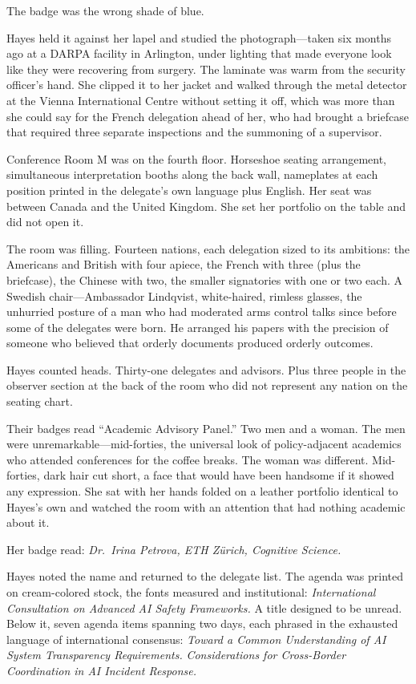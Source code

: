 The badge was the wrong shade of blue.

Hayes held it against her lapel and studied the photograph---taken six months ago at a DARPA facility in Arlington, under lighting that made everyone look like they were recovering from surgery. The laminate was warm from the security officer's hand. She clipped it to her jacket and walked through the metal detector at the Vienna International Centre without setting it off, which was more than she could say for the French delegation ahead of her, who had brought a briefcase that required three separate inspections and the summoning of a supervisor.

Conference Room M was on the fourth floor. Horseshoe seating arrangement, simultaneous interpretation booths along the back wall, nameplates at each position printed in the delegate's own language plus English. Her seat was between Canada and the United Kingdom. She set her portfolio on the table and did not open it.

The room was filling. Fourteen nations, each delegation sized to its ambitions: the Americans and British with four apiece, the French with three (plus the briefcase), the Chinese with two, the smaller signatories with one or two each. A Swedish chair---Ambassador Lindqvist, white-haired, rimless glasses, the unhurried posture of a man who had moderated arms control talks since before some of the delegates were born. He arranged his papers with the precision of someone who believed that orderly documents produced orderly outcomes.

Hayes counted heads. Thirty-one delegates and advisors. Plus three people in the observer section at the back of the room who did not represent any nation on the seating chart.

Their badges read ``Academic Advisory Panel.'' Two men and a woman. The men were unremarkable---mid-forties, the universal look of policy-adjacent academics who attended conferences for the coffee breaks. The woman was different. Mid-forties, dark hair cut short, a face that would have been handsome if it showed any expression. She sat with her hands folded on a leather portfolio identical to Hayes's own and watched the room with an attention that had nothing academic about it.

Her badge read: \textit{Dr.\ Irina Petrova, ETH Z\"urich, Cognitive Science.}

Hayes noted the name and returned to the delegate list. The agenda was printed on cream-colored stock, the fonts measured and institutional: \textit{International Consultation on Advanced AI Safety Frameworks.} A title designed to be unread. Below it, seven agenda items spanning two days, each phrased in the exhausted language of international consensus: \textit{Toward a Common Understanding of AI System Transparency Requirements.} \textit{Considerations for Cross-Border Coordination in AI Incident Response.}

